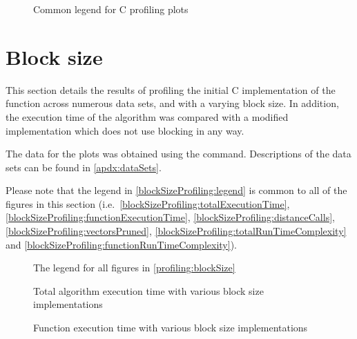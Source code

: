 \begin{figure}
    
    \caption{Common legend for C profiling plots}
    \label{profiling:c:legend}
\end{figure}




\section{Block size}
\label{profiling:blockSize}
This section details the results of profiling the initial C implementation of
the  function across numerous data sets, and
with a varying block size. In addition, the execution time of the algorithm was
compared with a modified implementation which does not use blocking in any way.

The data for the plots was obtained using the 
 command. Descriptions of the data sets can be found in
\autoref{apdx:dataSets}.


Please note that the legend in \autoref{blockSizeProfiling:legend} is common to
all of the figures in this section (i.e.\
\autoref{blockSizeProfiling:totalExecutionTime},
\autoref{blockSizeProfiling:functionExecutionTime},
\autoref{blockSizeProfiling:distanceCalls},
\autoref{blockSizeProfiling:vectorsPruned},
\autoref{blockSizeProfiling:totalRunTimeComplexity} and
\autoref{blockSizeProfiling:functionRunTimeComplexity}).

\begin{figure}[H]
    \centering
    
    \caption[Block size profiling legend]
        {The legend for all figures in \autoref{profiling:blockSize}}
    \label{blockSizeProfiling:legend}
\end{figure}

\begin{figure}[H]
    \centering
    
    \caption{Total algorithm execution time with various block size
        implementations}
    \label{blockSizeProfiling:totalExecutionTime}
\end{figure}

\begin{figure}[H]
    \centering
    
    \caption{Function execution time with various block size implementations}
    \label{blockSizeProfiling:functionExecutionTime}
\end{figure}

